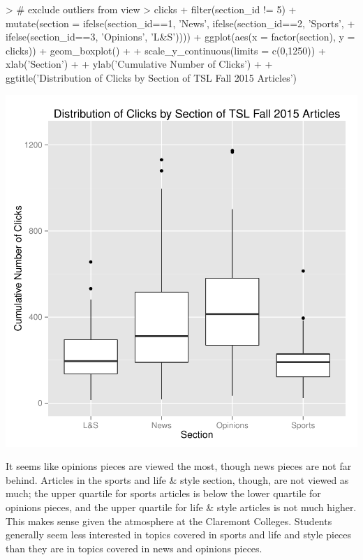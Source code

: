 \documentclass[a4paper]{article}
\begin{document}
\begin{Schunk}
\begin{Sinput}
> # exclude outliers from view
> clicks %
+   filter(section_id != 5) %
+   mutate(section = ifelse(section_id==1, 'News', ifelse(section_id==2, 'Sports',
+   ifelse(section_id==3, 'Opinions', 'L&S')))) %
+   ggplot(aes(x = factor(section), y = clicks)) + geom_boxplot() +
+   scale_y_continuous(limits = c(0,1250)) + xlab('Section') +
+   ylab('Cumulative Number of Clicks') +
+   ggtitle('Distribution of Clicks by Section of TSL Fall 2015 Articles')
\end{Sinput}
\end{Schunk}
\includegraphics{FinalProject-027}

It seems like opinions pieces are viewed the most, though news pieces are not far behind. Articles in the sports and life \& style section, though, are not viewed as much; the upper quartile for sports articles is below the lower quartile for opinions pieces, and the upper quartile for life \& style articles is not much higher. This makes sense given the atmosphere at the Claremont Colleges. Students generally seem less interested in topics covered in sports and life and style pieces than they are in topics covered in news and opinions pieces.
\end{document}
